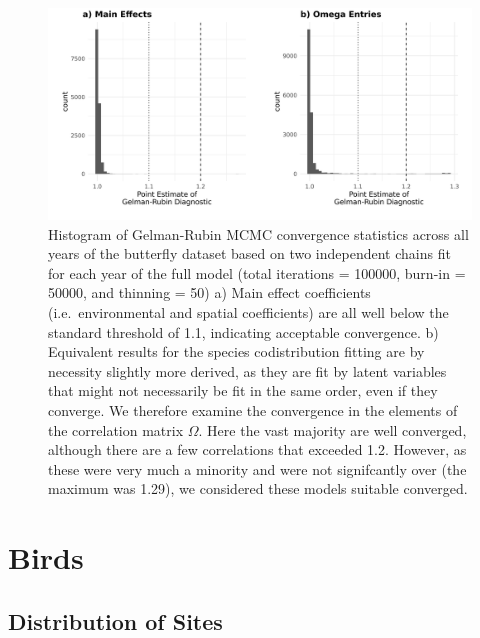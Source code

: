 \documentclass[
]{article}
\begin{document}
\begin{figure}
\centering
\includegraphics{ButterflyMarkdowns/ButterflySIFigs/ButterflyConvergence_GR.png}
\caption{Histogram of Gelman-Rubin MCMC convergence statistics across
all years of the butterfly dataset based on two independent chains fit
for each year of the full model (total iterations = 100000, burn-in =
50000, and thinning = 50) a) Main effect coefficients
(i.e.~environmental and spatial coefficients) are all well below the
standard threshold of 1.1, indicating acceptable convergence. b)
Equivalent results for the species codistribution fitting are by
necessity slightly more derived, as they are fit by latent variables
that might not necessarily be fit in the same order, even if they
converge. We therefore examine the convergence in the elements of the
correlation matrix \(\Omega\). Here the vast majority are well
converged, although there are a few correlations that exceeded 1.2.
However, as these were very much a minority and were not signifcantly
over (the maximum was 1.29), we considered these models suitable
converged.}
\end{figure}

\hypertarget{birds}{%
\section{Birds}\label{birds}}

\hypertarget{distribution-of-sites-1}{%
\subsection{Distribution of Sites}\label{distribution-of-sites-1}}
\end{document}
